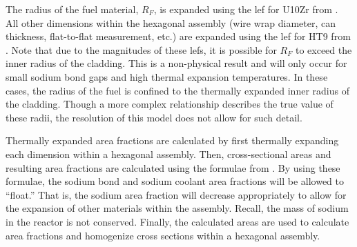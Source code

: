     The radius of the fuel material, $R_F$, is expanded using the \gls{lef} for
    U10Zr from . All other dimensions within the hexagonal
    assembly (wire wrap diameter, can thickness, flat-to-flat measurement, etc.)
    are expanded using the \gls{lef} for HT9 from . Note that
    due to the magnitudes of these \glspl{lef}, it is possible for $R_F$ to
    exceed the inner radius of the cladding. This is a non-physical result and
    will only occur for small sodium bond gaps and high thermal expansion
    temperatures. In these cases, the radius of the fuel is confined to the
    thermally expanded inner radius of the cladding. Though a more complex
    relationship describes the true value of these radii, the resolution of this
    model does not allow for such detail.
    
    Thermally expanded area fractions are calculated by first thermally 
    expanding each dimension within a hexagonal assembly. Then, cross-sectional
    areas and resulting area fractions are calculated using the formulae from
    . By using these formulae, the sodium bond
    and sodium coolant area fractions will be allowed to ``float.'' That is, the
    sodium area fraction will decrease appropriately to allow for the expansion
    of other materials within the assembly. Recall, the mass of sodium in the
    reactor is not conserved. Finally, the calculated areas are used to
    calculate area fractions and homogenize cross sections within a hexagonal
    assembly.
  
